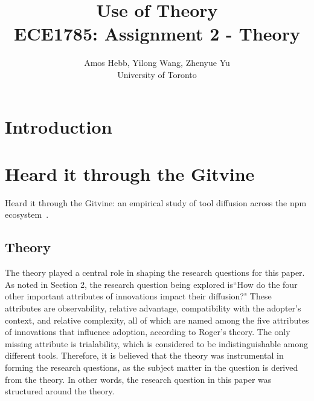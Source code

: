 \documentclass[journal,12pt,onecolumn,]{IEEEtran}
\begin{document}
\title{Use of Theory\\
{\normalsize ECE1785: Assignment 2 - Theory}}

\author{Amos Hebb, Yilong Wang, Zhenyue Yu\\ \small University of Toronto}

\maketitle






\section{Introduction}

\section{Heard it through the {\sc Git}vine}

Heard it through the {\sc Git}vine: an empirical study of tool diffusion across the npm ecosystem~\cite{lamba2020heard}.

\subsection{Theory}
The theory played a central role in shaping the research questions for this paper. As noted in Section 2, the research question being explored is``How do the four other important attributes of innovations impact their diffusion?"
 These attributes are observability, relative advantage, compatibility with the adopter's context, and relative complexity, all of which are named among the five attributes of innovations that influence adoption, according to Roger's theory. The only missing attribute is trialability, which is considered to be indistinguishable among different tools. 
 Therefore, it is believed that the theory was instrumental in forming the research questions, as the subject matter in the question is derived from the theory. In other words, the research question in this paper was structured around the theory.
\end{document}

